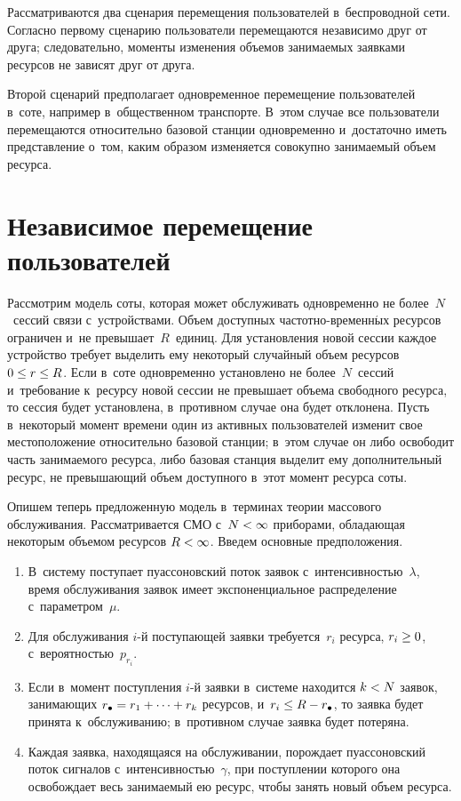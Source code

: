 \begin{multicols}{2}
  Рассматриваются два сценария перемещения пользователей 
в~беспроводной сети. Согласно первому сценарию пользователи 
перемещаются независимо друг от друга; следовательно, моменты изменения 
объемов занимаемых заявками ресурсов не зависят друг от друга. 
  
  Второй сценарий предполагает одновременное перемещение 
пользователей в~соте, например в~общест\-венном транспорте. В~этом случае 
все пользователи перемещаются относительно базовой станции 
одновременно и~достаточно иметь пред\-став\-ле\-ние о~том, каким образом 
изменяется совокупно занимаемый объем ресурса.
  
\section{Независимое перемещение пользователей}

  Рассмотрим модель соты, которая может обслуживать одновременно не 
более~$N$~сессий связи с~устройствами. Объем доступных  
час\-тот\-но-вре\-мен\-н$\acute{\mbox{ы}}$х ресурсов ограничен и~не 
превышает~$R$~единиц. Для установления новой сессии каждое устройство 
требует выделить ему некоторый случайный объем ресурсов $0\hm\leq 
r\hm\leq R$. Если в~соте одновременно установлено не более~$N$~сессий 
и~требование к~ресурсу новой сессии не превышает объема свободного 
ресурса, то сессия будет установлена, в~противном случае она будет 
отклонена. Пусть в~некоторый момент времени один из активных 
пользователей изменит свое местоположение относительно базовой станции; 
в~этом случае он либо освободит часть занимаемого ресурса, либо базовая 
станция выделит ему дополнительный ресурс, не превышающий объем 
доступного в~этот момент ресурса соты. 
  
  Опишем теперь предложенную модель в~терминах теории массового 
обслуживания. Рассматривается СМО с~$N\hm<\infty$ приборами, 
обладающая некоторым объемом ресурсов $R\hm<\infty$. Введем основные 
предположения.
  \begin{enumerate}[1.]
\item В~систему поступает пуассоновский поток заявок 
с~интенсивностью~$\lambda$, время обслуживания заявок имеет 
экспоненциальное распределение с~параметром~$\mu$. 
\item Для обслуживания $i$-й поступающей заявки требуется~$r_i$ 
ресурса, $r_i\hm\geq 0$, с~вероятностью~$p_{r_i}$. 
\item Если в~момент поступления $i$-й заявки в~сис\-те\-ме находится 
$k\hm<N$ заявок, занимающих $r_\bullet \hm= r_1+\cdots+r_k$ ресурсов, 
и~$r_i\hm\leq R\hm-r_\bullet$, то заявка будет принята к~обслуживанию; 
в~противном случае заявка будет потеряна.
\item Каждая заявка, находящаяся на обслуживании, порождает 
пуассоновский поток сигналов с~ин\-тен\-сив\-ностью~$\gamma$, при 
поступлении которого она освобождает весь занимаемый ею ресурс, чтобы 
занять новый объем ресурса.
  \end{enumerate}
  

\end{multicols}
